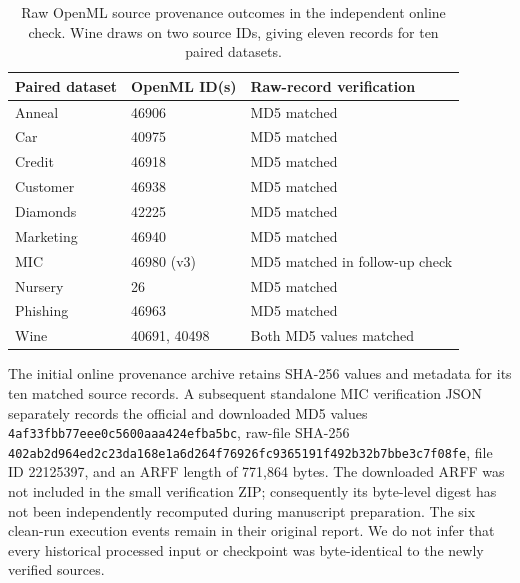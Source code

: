 \documentclass[a4paper,fleqn]{cas-sc}
\begin{document}
\begin{table}[htbp]
\centering
\caption{Raw OpenML source provenance outcomes in the independent online check. Wine draws on two source IDs, giving eleven records for ten paired datasets.}
\label{tab:openmlprovenance}
\begin{tabular}{lll}
\toprule
Paired dataset & OpenML ID(s) & Raw-record verification\\
\midrule
Anneal & 46906 & MD5 matched\\
Car & 40975 & MD5 matched\\
Credit & 46918 & MD5 matched\\
Customer & 46938 & MD5 matched\\
Diamonds & 42225 & MD5 matched\\
Marketing & 46940 & MD5 matched\\
MIC & 46980 (v3) & MD5 matched in follow-up check\\
Nursery & 26 & MD5 matched\\
Phishing & 46963 & MD5 matched\\
Wine & 40691, 40498 & Both MD5 values matched\\
\bottomrule
\end{tabular}
\end{table}
The initial online provenance archive retains SHA-256 values and metadata for its ten matched source records. A subsequent standalone MIC verification JSON separately records the official and downloaded MD5 values \texttt{4af33fbb77eee0c5\allowbreak 600aaa424efba5bc}, raw-file SHA-256 \texttt{402ab2d964ed2c23\allowbreak da168e1a6d264f76\allowbreak 926fc9365191f492\allowbreak b32b7bbe3c7f08fe}, file ID 22125397, and an ARFF length of 771,864 bytes. The downloaded ARFF was not included in the small verification ZIP; consequently its byte-level digest has not been independently recomputed during manuscript preparation. The six clean-run execution events remain in their original report. We do not infer that every historical processed input or checkpoint was byte-identical to the newly verified sources.

\FloatBarrier
\end{document}
